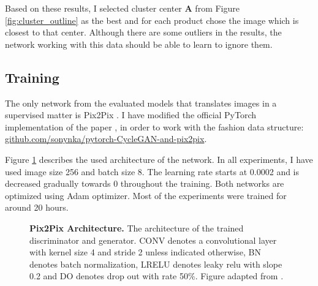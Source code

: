 \documentclass[12pt]{report}
\begin{document}
Based on these results, I selected cluster center \textbf{A} from Figure \ref{fig:cluster_outline} as the best and for each product chose the image which is closest to that center. Although there are some outliers in the results, the network working with this data should be able to learn to ignore them.

\pagebreak
\subsection{Training}
The only network from the evaluated models that translates images in a supervised matter is Pix2Pix \cite{isola_image--image_2016}. I have modified the official PyTorch implementation of the paper \cite{noauthor_junyanz/pytorch-cyclegan-and-pix2pix_nodate}, in order to work with the fashion data structure: \hyperlink{https://github.com/sonynka/pytorch-CycleGAN-and-pix2pix}{github.com/sonynka/pytorch-CycleGAN-and-pix2pix}.

Figure \ref{fig:pix2pix_arch} describes the used architecture of the network. In all experiments, I have used image size 256 and batch size 8. The learning rate starts at 0.0002 and is decreased gradually towards 0 throughout the training. Both networks are optimized using Adam optimizer. Most of the experiments were trained for around 20 hours.

\begin{figure}[h]
\centering
{}\vspace{.5cm}
\caption{\label{fig:pix2pix_arch} \textbf{Pix2Pix Architecture.} The architecture of the trained  discriminator and generator. CONV denotes a convolutional layer with kernel size 4 and stride 2 unless indicated otherwise, BN denotes batch normalization, LRELU denotes leaky relu with slope 0.2 and DO denotes drop out with rate 50\%. Figure adapted from \cite{hesse_image--image_2017}.}
\end{figure}
\end{document}
